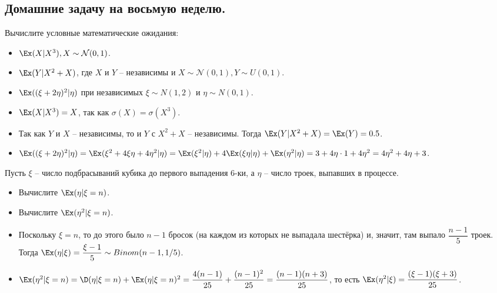 \subsection{Домашние задачу на восьмую неделю.}
\begin{problem}
    Вычислите условные математические ожидания:
    \begin{itemize}
        \item $\Ex(X|X^3), X \sim \mathcal{N}(0, 1)$.
        \item $\Ex(Y|X^2 + X)$, где $X$ и $Y$ -- независимы и $X \sim \mathcal{N}(0, 1), Y \sim U(0, 1)$.
        \item $\Ex((\xi + 2\eta)^2 |\eta)$ при независимых $\xi \sim N(1, 2)$ и $\eta \sim N(0, 1)$.
    \end{itemize}
\end{problem}
\begin{solution} \leavevmode
    \begin{itemize}
        \item $\Ex(X|X^3) = X$, так как $\sigma(X) = \sigma(X^3)$.
        \item Так как $Y$ и $X$ -- независимы, то и $Y$ с $X^2 + X$ -- независимы. Тогда $\Ex(Y|X^2 + X) = \Ex(Y) = 0.5$.
        \item $\Ex((\xi + 2\eta)^2|\eta) = \Ex(\xi^2 + 4\xi\eta + 4\eta^2 | \eta) = \Ex(\xi^2|\eta) + 4\Ex(\xi\eta|\eta) + \Ex(\eta^2|\eta) = 3 + 4\eta \cdot 1  +4\eta^2 = 4\eta^2 + 4\eta + 3$.
    \end{itemize}
\end{solution}
\begin{problem}
    Пусть $\xi$ -- число подбрасываний кубика до первого выпадения $6$-ки, а $\eta$ -- число троек, выпавших в процессе.
    \begin{itemize}
        \item Вычислите $\Ex(\eta |\xi = n)$.
        \item Вычислите $\Ex(\eta^2 |\xi = n)$.
    \end{itemize}
\end{problem}
\begin{solution} \leavevmode
    \begin{itemize}
        \item Поскольку $\xi = n$, то до этого было $n - 1$ бросок (на каждом из которых не выпадала шестёрка) и, значит, там выпало $\dfrac{n - 1}{5}$ троек.
        Тогда $\Ex(\eta|\xi) = \dfrac{\xi - 1}{5} \sim Binom(n - 1, 1/5)$.
        \item $\Ex(\eta^2 |\xi = n) = \D(\eta|\xi = n) + \Ex(\eta|\xi = n)^2 = \dfrac{4(n - 1)}{25} + \dfrac{(n - 1)^2}{25} = \dfrac{(n - 1)(n + 3)}{25}$, то есть $\Ex(\eta^2|\xi) = \dfrac{(\xi - 1)(\xi + 3)}{25}$.
    \end{itemize}
\end{solution}
